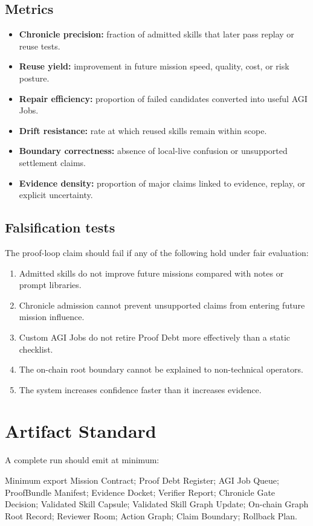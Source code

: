 \documentclass[11pt]{article}
\begin{document}
\subsection{Metrics}
\begin{itemize}
  \item \textbf{Chronicle precision:} fraction of admitted skills that later pass replay or reuse tests.
  \item \textbf{Reuse yield:} improvement in future mission speed, quality, cost, or risk posture.
  \item \textbf{Repair efficiency:} proportion of failed candidates converted into useful AGI Jobs.
  \item \textbf{Drift resistance:} rate at which reused skills remain within scope.
  \item \textbf{Boundary correctness:} absence of local-live confusion or unsupported settlement claims.
  \item \textbf{Evidence density:} proportion of major claims linked to evidence, replay, or explicit uncertainty.
\end{itemize}

\subsection{Falsification tests}
The proof-loop claim should fail if any of the following hold under fair evaluation:
\begin{enumerate}
  \item Admitted skills do not improve future missions compared with notes or prompt libraries.
  \item Chronicle admission cannot prevent unsupported claims from entering future mission influence.
  \item Custom AGI Jobs do not retire Proof Debt more effectively than a static checklist.
  \item The on-chain root boundary cannot be explained to non-technical operators.
  \item The system increases confidence faster than it increases evidence.
\end{enumerate}

\section{Artifact Standard}
A complete run should emit at minimum:
\begin{notebox}{Minimum export}
Mission Contract; Proof Debt Register; AGI Job Queue; ProofBundle Manifest; Evidence Docket; Verifier Report; Chronicle Gate Decision; Validated Skill Capsule; Validated Skill Graph Update; On-chain Graph Root Record; Reviewer Room; Action Graph; Claim Boundary; Rollback Plan.
\end{notebox}
\end{document}
